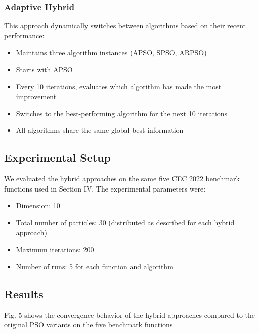 \documentclass[conference]{IEEEtran}
\begin{document}
\subsubsection{Adaptive Hybrid}
This approach dynamically switches between algorithms based on their recent performance:
\begin{itemize}
    \item Maintains three algorithm instances (APSO, SPSO, ARPSO)
    \item Starts with APSO
    \item Every 10 iterations, evaluates which algorithm has made the most improvement
    \item Switches to the best-performing algorithm for the next 10 iterations
    \item All algorithms share the same global best information
\end{itemize}

\subsection{Experimental Setup}
We evaluated the hybrid approaches on the same five CEC 2022 benchmark functions used in Section IV. The experimental parameters were:
\begin{itemize}
    \item Dimension: 10
    \item Total number of particles: 30 (distributed as described for each hybrid approach)
    \item Maximum iterations: 200
    \item Number of runs: 5 for each function and algorithm
\end{itemize}

\subsection{Results}
Fig. 5 shows the convergence behavior of the hybrid approaches compared to the original PSO variants on the five benchmark functions.
\end{document}
